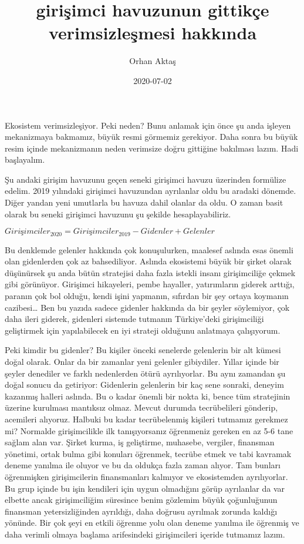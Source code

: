 \documentclass[
]{article}
\title{girişimci havuzunun gittikçe verimsizleşmesi hakkında}
\author{Orhan Aktaş}
\date{2020-07-02}
\begin{document}
\maketitle

Ekosistem verimsizleşiyor. Peki neden? Bunu anlamak için önce şu anda
işleyen mekanizmaya bakmamız, büyük resmi görmemiz gerekiyor. Daha sonra
bu büyük resim içinde mekanizmanın neden verimsize doğru gittiğine
bakılması lazım. Hadi başlayalım.

Şu andaki girişim havuzunu geçen seneki girişimci havuzu üzerinden
formülize edelim. 2019 yılındaki girişimci havuzundan ayrılanlar oldu bu
aradaki dönemde. Diğer yandan yeni umutlarla bu havuza dahil olanlar da
oldu. O zaman basit olarak bu seneki girişimci havuzunu şu şekilde
hesaplayabiliriz.

\(Girişimciler_{2020} = Girişimciler_{2019}-Gidenler+Gelenler\)

Bu denklemde gelenler hakkında çok konuşulurken, maalesef aslında esas
önemli olan gidenlerden çok az bahsediliyor. Aslında ekosistemi büyük
bir şirket olarak düşünürsek şu anda bütün stratejisi daha fazla istekli
insanı girişimciliğe çekmek gibi görünüyor. Girişimci hikayeleri, pembe
hayaller, yatırımların giderek arttığı, paranın çok bol olduğu, kendi
işini yapmanın, sıfırdan bir şey ortaya koymanın cazibesi\ldots{} Ben bu
yazıda sadece gidenler hakkında da bir şeyler söylemiyor, çok daha ileri
giderek, gidenleri sistemde tutmanın Türkiye'deki girişimciliği
geliştirmek için yapılabilecek en iyi strateji olduğunu anlatmaya
çalışıyorum.

Peki kimdir bu gidenler? Bu kişiler önceki senelerde gelenlerin bir alt
kümesi doğal olarak. Onlar da bir zamanlar yeni gelenler gibiydiler.
Yıllar içinde bir şeyler denediler ve farklı nedenlerden ötürü
ayrılıyorlar. Bu aynı zamandan şu doğal sonucu da getiriyor: Gidenlerin
gelenlerin bir kaç sene sonraki, deneyim kazanmış halleri aslında. Bu o
kadar önemli bir nokta ki, bence tüm stratejinin üzerine kurulması
mantıksız olmaz. Mevcut durumda tecrübelileri gönderip, acemileri
alıyoruz. Halbuki bu kadar tecrübelenmiş kişileri tutmamız gerekmez mi?
Normalde girişimcilikle ilk tanışıyorsanız öğrenmeniz gereken en az 5-6
tane sağlam alan var. Şirket kurma, iş geliştirme, muhasebe, vergiler,
finansman yönetimi, ortak bulma gibi konuları öğrenmek, tecrübe etmek ve
tabi kavramak deneme yanılma ile oluyor ve bu da oldukça fazla zaman
alıyor. Tam bunları öğrenmişken girişimcilerin finansmanları kalmıyor ve
ekosistemden ayrılıyorlar. Bu grup içinde bu işin kendileri için uygun
olmadığını görüp ayrılanlar da var elbette ancak girişimciliğim
süresince benim gözlemim büyük çoğunluğunun finansman yetersizliğinden
ayrıldığı, daha doğrusu ayrılmak zorunda kaldığı yönünde. Bir çok şeyi
en etkili öğrenme yolu olan deneme yanılma ile öğrenmiş ve daha verimli
olmaya başlama arifesindeki girişimcileri içeride tutmamız lazım.
\end{document}
